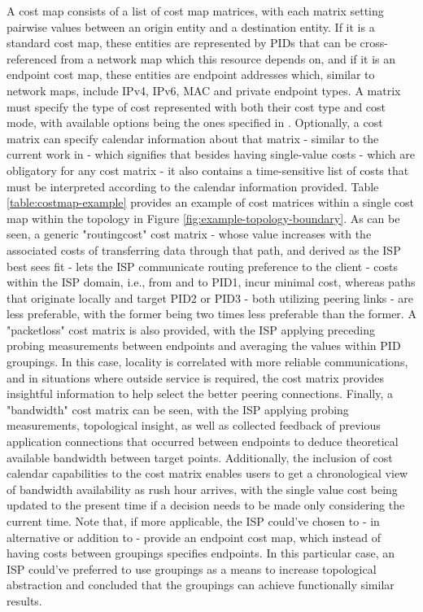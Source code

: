     A cost map consists of a list of cost map matrices, with each matrix setting pairwise values between an origin entity and a destination entity.
    If it is a standard cost map, these entities are represented by PIDs that can be cross-referenced from a network map which this resource depends on, and if it is an endpoint cost map, these entities are endpoint addresses which, similar to network maps, include IPv4, IPv6, MAC and private endpoint types.
    A matrix must specify the type of cost represented with both their cost type and cost mode, with available options being the ones specified in \cite{alto-cost-metrics(draft)}.
    Optionally, a cost matrix can specify calendar information about that matrix - similar to the current work in \cite{alto-calendar-cost-map(draft)} -  which signifies that besides having single-value costs - which are obligatory for any cost matrix - it also contains a time-sensitive list of costs that must be interpreted according to the calendar information provided.
    Table \ref{table:costmap-example} provides an example of cost matrices within a single cost map within the topology in Figure \ref{fig:example-topology-boundary}.
    As can be seen, a generic "routingcost" cost matrix - whose value increases with the associated costs of transferring data through that path, and derived as the ISP best sees fit - lets the ISP communicate routing preference to the client - costs within the ISP domain, i.e., from and to PID1, incur minimal cost, whereas paths that originate locally and target PID2 or PID3 - both utilizing peering links - are less preferable, with the former being two times less preferable than the former.
    A "packetloss" cost matrix is also provided, with the ISP applying preceding probing measurements between endpoints and averaging the values within PID groupings.
    In this case, locality is correlated with more reliable communications, and in situations where outside service is required, the cost matrix provides insightful information to help select the better peering connections.
    Finally, a "bandwidth" cost matrix can be seen, with the ISP applying probing measurements, topological insight, as well as collected feedback of previous application connections that occurred between endpoints to deduce theoretical available bandwidth between target points.
    Additionally, the inclusion of cost calendar capabilities to the cost matrix enables users to get a chronological view of bandwidth availability as rush hour arrives, with the single value cost being updated to the present time if a decision needs to be made only considering the current time.
    Note that, if more applicable, the ISP could've chosen to - in alternative or addition to - provide an endpoint cost map, which instead of having costs between groupings specifies endpoints.
    In this particular case, an ISP could've preferred to use groupings as a means to increase topological abstraction and concluded that the groupings can achieve functionally similar results.


